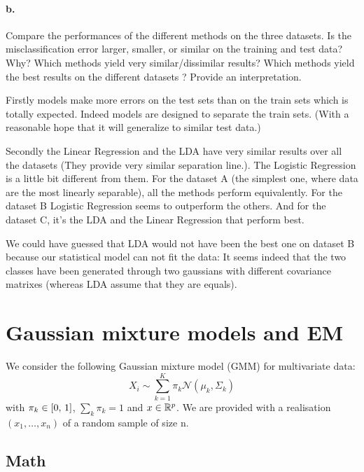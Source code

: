 \documentclass{article}
\begin{document}
\paragraph{b.} Compare the performances of the different methods on the three datasets. Is the misclassification error larger, smaller,
or similar on the training and test data? Why? Which methods yield very similar/dissimilar results? Which methods yield the best
results on the different datasets ? Provide an interpretation.\vspace{10px}

Firstly models make more errors on the test sets than on the train sets which is totally expected. Indeed models are designed to separate the train sets.
(With a reasonable hope that it will generalize to similar test data.)

Secondly the Linear Regression and the LDA have very similar results over all the datasets (They provide very similar separation line.). The
Logistic Regression is a little bit different from them. For the dataset A (the simplest one, where data are the most linearly separable),
all the methods perform equivalently. For the dataset B Logistic Regression seems to outperform the others. And for the dataset C,
it's the LDA and the Linear Regression that perform best.

We could have guessed that LDA would not have been the best one on dataset B because our statistical model can not fit the data: It seems indeed that
the two classes have been generated through two gaussians with different covariance matrixes (whereas LDA assume that they are equals).

\section{Gaussian mixture models and EM}
We consider the following Gaussian mixture model (GMM) for multivariate data:
\begin{equation*}
    X_i \sim \sum_{k=1}^K \pi_k \mathcal{N}(\mu_k, \Sigma_k)
\end{equation*}
with $\pi_k \in \left[0,\, 1\right]$, $\sum_k \pi_k = 1$ and $x \in \mathbb{R}^p$. We are provided with a realisation $(x_1,\dots,x_n)$ of a random sample of size n.

\subsection{Math}
\end{document}
